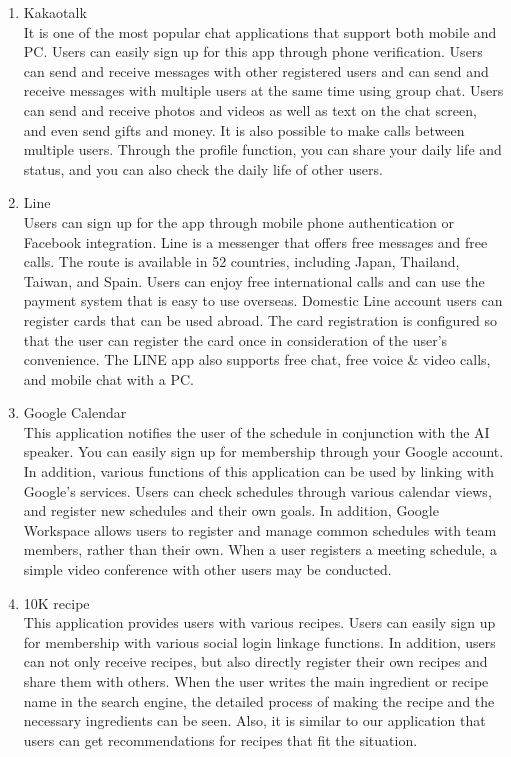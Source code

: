 \documentclass[conference]{IEEEtran}
\begin{document}
\begin{enumerate}
    \item Kakaotalk
    \\
    It is one of the most popular chat applications that support both mobile and PC. Users can easily sign up for this app through phone verification. Users can send and receive messages with other registered users and can send and receive messages with multiple users at the same time using group chat. Users can send and receive photos and videos as well as text on the chat screen, and even send gifts and money. It is also possible to make calls between multiple users. Through the profile function, you can share your daily life and status, and you can also check the daily life of other users.
    \\

    \item Line
    \\
    Users can sign up for the app through mobile phone authentication or Facebook integration. Line is a messenger that offers free messages and free calls. The route is available in 52 countries, including Japan, Thailand, Taiwan, and Spain. Users can enjoy free international calls and can use the payment system that is easy to use overseas. Domestic Line account users can register cards that can be used abroad. The card registration is configured so that the user can register the card once in consideration of the user's convenience. The LINE app also supports free chat, free voice \& video calls, and mobile chat with a PC.
    \\

    \item Google Calendar
    \\
    This application notifies the user of the schedule in conjunction with the AI speaker. You can easily sign up for membership through your Google account. In addition, various functions of this application can be used by linking with Google's services. Users can check schedules through various calendar views, and register new schedules and their own goals. In addition, Google Workspace allows users to register and manage common schedules with team members, rather than their own. When a user registers a meeting schedule, a simple video conference with other users may be conducted.\\

    \item 10K recipe
    \\
    This application provides users with various recipes. Users can easily sign up for membership with various social login linkage functions. In addition, users can not only receive recipes, but also directly register their own recipes and share them with others. When the user writes the main ingredient or recipe name in the search engine, the detailed process of making the recipe and the necessary ingredients can be seen. Also, it is similar to our application that users can get recommendations for recipes that fit the situation.\\
\end{enumerate}
\end{document}
